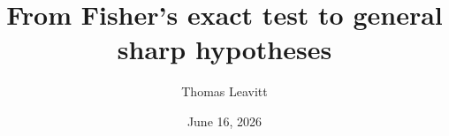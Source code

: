 \documentclass[table, xcolor = {dvipsnames}, 9pt]{beamer}
\title[]{From Fisher's exact test to general sharp hypotheses} %
\author{Thomas Leavitt} %
\institute[] %
{
\medskip
\textit{} %
}
\date{June 16, 2026} %
\theoremstyle{plain}
\begin{document}
\begin{frame}
\titlepage %
\end{frame}


\end{document}
